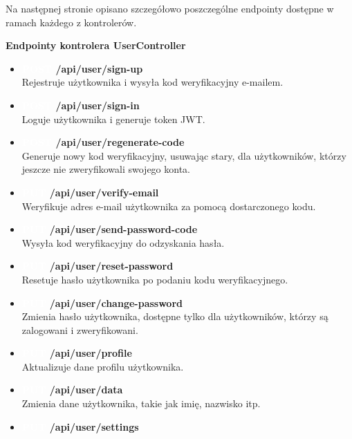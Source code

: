 \documentclass[12pt,a4paper]{article}
\begin{document}
\noindent
Na następnej stronie opisano szczegółowo poszczególne endpointy dostępne w ramach każdego z kontrolerów.

\newpage

\textbf{Endpointy kontrolera UserController}
\begin{itemize} 
    \item \textbf{\colorbox{green!90}{\textcolor{white}{POST}} /api/user/sign-up} \\
    Rejestruje użytkownika i wysyła kod weryfikacyjny e-mailem. 
    \item \textbf{\colorbox{green!90}{\textcolor{white}{POST}} /api/user/sign-in} \\
    Loguje użytkownika i generuje token JWT. 
    \item \textbf{\colorbox{green!90}{\textcolor{white}{POST}} /api/user/regenerate-code} \\
    Generuje nowy kod weryfikacyjny, usuwając stary, dla użytkowników, którzy jeszcze nie zweryfikowali swojego konta. 
    \item \textbf{\colorbox{orange!90}{\textcolor{white}{PUT}} /api/user/verify-email} \\
    Weryfikuje adres e-mail użytkownika za pomocą dostarczonego kodu. 
    \item \textbf{\colorbox{orange!90}{\textcolor{white}{PUT}} /api/user/send-password-code} \\
    Wysyła kod weryfikacyjny do odzyskania hasła. 
    \item \textbf{\colorbox{orange!90}{\textcolor{white}{PUT}} /api/user/reset-password} \\
    Resetuje hasło użytkownika po podaniu kodu weryfikacyjnego. 
    \item \textbf{\colorbox{orange!90}{\textcolor{white}{PUT}} /api/user/change-password} \\
    Zmienia hasło użytkownika, dostępne tylko dla użytkowników, którzy są zalogowani i zweryfikowani. 
    \item \textbf{\colorbox{orange!90}{\textcolor{white}{PUT}} /api/user/profile} \\
    Aktualizuje dane profilu użytkownika. 
    \item \textbf{\colorbox{orange!90}{\textcolor{white}{PUT}} /api/user/data} \\
    Zmienia dane użytkownika, takie jak imię, nazwisko itp. 
    \item \textbf{\colorbox{orange!90}{\textcolor{white}{PUT}} /api/user/settings} \\

\end{itemize}
\end{document}
